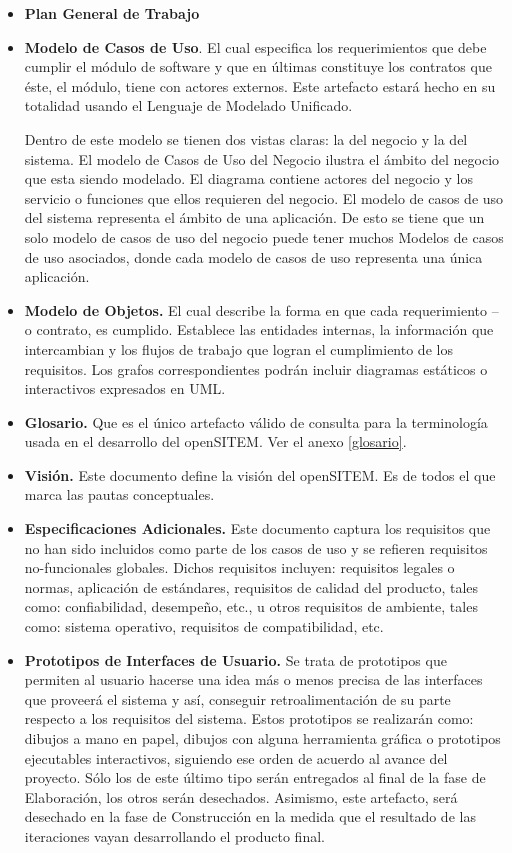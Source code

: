 \begin{itemize}
\item \textbf{Plan General de Trabajo}
\item \textbf{Modelo de Casos de Uso}. El cual especifica los requerimientos que debe cumplir el módulo de software y que en últimas constituye los contratos que éste, el módulo, tiene con actores externos. Este artefacto estará hecho en su totalidad usando el Lenguaje de Modelado Unificado. 

Dentro de este modelo se tienen dos vistas claras: la del negocio y la del sistema. El modelo de Casos de Uso del Negocio ilustra el ámbito del negocio que esta siendo modelado. El diagrama contiene actores del negocio y los servicio o funciones que ellos requieren del negocio. El modelo de casos de uso del sistema representa el ámbito de una aplicación. De esto se tiene que un solo modelo de casos de uso del negocio puede tener muchos Modelos de casos de uso asociados, donde cada modelo de casos de uso representa una única aplicación.

\item \textbf{Modelo de Objetos.} El cual describe la forma en que cada requerimiento – o contrato,  es cumplido. Establece las entidades internas, la información que intercambian y los flujos de trabajo que logran el cumplimiento de los requisitos. Los grafos correspondientes podrán incluir diagramas estáticos o interactivos expresados en UML.

\item \textbf{Glosario.} Que es el único artefacto válido de consulta para la terminología usada en el desarrollo del openSITEM. Ver el anexo \ref{glosario}.

\item \textbf{Visión.} Este documento define la visión del openSITEM. Es de todos el que marca las pautas conceptuales. 

\item \textbf{Especificaciones Adicionales.} Este documento captura los requisitos que no han sido incluidos como parte de los casos de uso y se refieren requisitos no-funcionales globales. Dichos requisitos incluyen: requisitos legales o normas, aplicación de estándares, requisitos de calidad del producto, tales como: confiabilidad, desempeño, etc., u otros requisitos de ambiente, tales como: sistema operativo, requisitos de compatibilidad, etc. 

\item \textbf{Prototipos de Interfaces de Usuario.} Se trata de prototipos que permiten al usuario hacerse una idea más o menos precisa de las interfaces que proveerá el sistema y así, conseguir retroalimentación de su parte respecto a los requisitos del sistema. Estos prototipos se realizarán como: dibujos a mano en papel, dibujos con alguna herramienta gráfica o prototipos ejecutables interactivos, siguiendo ese orden de acuerdo al avance del proyecto. Sólo los de este último tipo serán entregados al final de la fase de Elaboración, los otros serán desechados. Asimismo, este artefacto, será desechado en la fase de Construcción en la medida que el resultado de las iteraciones vayan desarrollando el producto final. 


\end{itemize}
